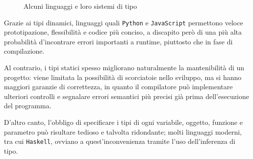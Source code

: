 \begin{figure}
      \caption{Alcuni linguaggi e loro sistemi di tipo}
      \label{fig:3-1-languages-type-systems}
      \vspace{4mm}
\end{figure}

\noindent Grazie ai tipi dinamici, linguaggi quali \texttt{Python} e \texttt{JavaScript} permettono
veloce prototipazione, flessibilità e codice più conciso, a discapito però di una più alta
probabilità d'incontrare errori importanti a runtime, piuttosto che in fase di compilazione.


Al contrario, i tipi statici spesso migliorano naturalmente la mantenibilità di un progetto:
viene limitata la possibilità di scorciatoie nello sviluppo, ma si hanno maggiori garanzie di correttezza,
in quanto il compilatore può implementare ulteriori controlli e segnalare errori semantici più precisi già
prima dell'esecuzione del programma.

\noindent D'altro canto, l'obbligo di specificare i tipi di ogni variabile, oggetto, funzione e
parametro può risultare tedioso e talvolta ridondante; molti linguaggi moderni,
tra cui \texttt{Haskell}, ovviano a quest'inconvenienza tramite l'uso dell'inferenza di tipo.

